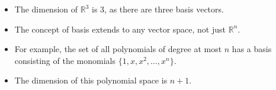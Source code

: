 \begin{frame}
    \begin{itemize}
            \item The dimension of $\mathbb{R}^3$ is 3, as there are three basis vectors.
            \item The concept of basis extends to any vector space, not just $\mathbb{R}^n$.
            \item For example, the set of all polynomials of degree at most $n$ has a basis consisting of the monomials $\{1, x, x^2, \ldots, x^n\}$.
            \item The dimension of this polynomial space is $n+1$.
    \end{itemize}
\end{frame}
 



